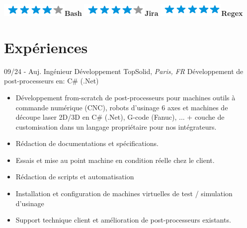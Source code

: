 \documentclass[]{friggeri-cv}
\begin{document}
\begin{flushleft}
\begin{multicols}{3}
\begin{itemize}
\begin{flushleft}
\includegraphics[scale=0.40]{res/img/4stars.png}\hspace{1.5mm}\textbf{Bash}
\includegraphics[scale=0.40]{res/img/4stars.png}\hspace{1.5mm}\textbf{Jira}
\includegraphics[scale=0.40]{res/img/5stars.png}\hspace{1.5mm}\textbf{Regex}
\end{flushleft}            


        \end{itemize}
        \end{multicols}
        \end{flushleft} \normalsize
        \vspace*{-0.65cm}
\section{Expériences}
\vspace*{-0.25cm}

\begin{entrylist}
  \entry
    {09/24 - Auj.}
    {Ingénieur Développement}
    {TopSolid, \textit{Paris, FR}}
    {Développement de post-processeurs en:  C\# (.Net)}
\end{entrylist}
\vspace{-15pt}

\vspace{0.5mm}
\begin{itemize}
\setlength{\itemsep}{1pt}
\setlength{\parskip}{0pt}
\setlength{\parsep}{0pt}

\item Développement from-scratch de post-processeurs pour machines outils à commande numérique (CNC), robots d'usinage 6 axes et machines de découpe laser 2D/3D en C\# (.Net), G-code (Fanuc), ... + couche de customisation dans un langage propriétaire pour nos intégrateurs.
\item Rédaction de documentations et spécifications.
\item Essais et mise au point machine en condition réelle chez le client.
\item Rédaction de scripts et automatisation
\item Installation et configuration de machines virtuelles de test / simulation d'usinage
\item Support technique client et amélioration de post-processeurs existants.
\end{itemize}
\end{document}
